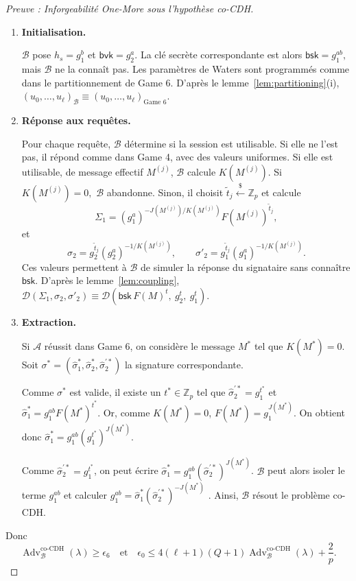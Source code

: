 \documentclass[10pt,a4paper]{article}
\theoremstyle{definition}
\theoremstyle{plain}
\theoremstyle{remark}
\newcommand{\sample}{\xleftarrow{\$}}
\begin{document}
\begin{proof}[Preuve : Inforgeabilité One-More sous l'hypothèse co-CDH]
\begin{enumerate}

\item \textbf{Initialisation.}

$\mathcal{B}$ pose
$
h_s=g_1^b
$
et
$
\mathsf{bvk}=g_2^a.
$
La clé secrète correspondante est alors
$
\mathsf{bsk}=g_1^{ab},
$
mais $\mathcal{B}$ ne la connaît pas.
Les paramètres de Waters sont programmés comme dans le
partitionnement de Game 6. D'après le lemme~\ref{lem:partitioning}(i),
$
(u_0,\ldots,u_\ell)_{\mathcal B}
\equiv
(u_0,\ldots,u_\ell)_{\text{Game 6}}.
$

\item \textbf{Réponse aux requêtes.}

Pour chaque requête, $\mathcal{B}$ détermine si la session est
utilisable.
Si elle ne l'est pas, il répond comme dans Game 4, avec des valeurs
uniformes.
Si elle est utilisable, de message effectif $M^{(j)}$, $\mathcal{B}$
calcule $K(M^{(j)})$.
Si
$
K(M^{(j)})=0,
$
$\mathcal{B}$ abandonne.
Sinon, il choisit $\widetilde{t}_j\sample\mathbb{Z}_p$ et calcule
\[
\Sigma_1
=
(g_1^a)^{-J(M^{(j)})/K(M^{(j)})}
F(M^{(j)})^{\widetilde{t}_j},
\]
et
\[
\sigma_2
=
g_2^{\widetilde{t}_j}(g_2^a)^{-1/K(M^{(j)})},
\qquad
\sigma'_2
=
g_1^{\widetilde{t}_j}(g_1^a)^{-1/K(M^{(j)})}.
\]
Ces valeurs permettent à $\mathcal{B}$ de simuler la réponse du
signataire sans connaître $\mathsf{bsk}$.
D'après le lemme~\ref{lem:coupling},
$
\mathcal{D}(\Sigma_1,\sigma_2,\sigma'_2)
\equiv
\mathcal{D}\left(\mathsf{bsk}\,F(M)^t,\ g_2^t,\ g_1^t\right).
$

\item \textbf{Extraction.}

Si $\mathcal{A}$ réussit dans Game 6, on considère le message $M^*$ tel que $K(M^*)=0$.
Soit 
$\sigma^*=(\widehat{\sigma}_1^*,\widehat{\sigma}_2^*,\widehat{\sigma}_2^{\prime *})$ 
la signature correspondante.

Comme $\sigma^*$ est valide, il existe un $t^*\in\mathbb{Z}_p$ tel que 
$\widehat{\sigma}_2^{\prime *}=g_1^{t^*}$ 
et 
$\widehat{\sigma}_1^*=g_1^{ab}F(M^*)^{t^*}$.
Or, comme $K(M^*)=0$, $F(M^*)=g_1^{J(M^*)}$.
On obtient donc 
$\widehat{\sigma}_1^*=g_1^{ab}\left(g_1^{t^*}\right)^{J(M^*)}$.

Comme 
$\widehat{\sigma}_2^{\prime *}=g_1^{t^*}$, 
on peut écrire 
$\widehat{\sigma}_1^*=g_1^{ab}\left(\widehat{\sigma}_2^{\prime *}\right)^{J(M^*)}$.
$\mathcal{B}$ peut alors isoler le terme $g_1^{ab}$ et calculer
$
g_1^{ab}=\widehat{\sigma}_1^*\left(\widehat{\sigma}_2^{\prime *}\right)^{-J(M^*)}
$
.
Ainsi, $\mathcal{B}$ résout le problème co-CDH.

\end{enumerate}

Donc
\[
\operatorname{Adv}_{\mathcal{B}}^{\mathrm{co\text{-}CDH}}(\lambda)
\geq \epsilon_6 
\quad
\text{et}
\quad
\epsilon_0
\leq
4(\ell+1)(Q+1)
\operatorname{Adv}_{\mathcal{B}}^{\mathrm{co\text{-}CDH}}(\lambda)
+
\frac{2}{p}.
\]

\end{proof}
\end{document}
